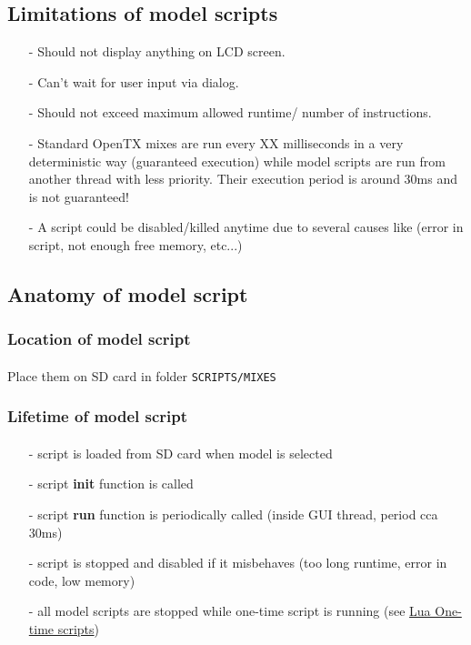 \documentclass[a4paper,french,10pt]{article}
\begin{document}
\subsection{Limitations of model scripts}
\begin{itemize}[leftmargin=*,itemsep=5mm,nolistsep]
\item[-] Should not display anything on LCD screen.
\item[-] Can't wait for user input via dialog.
\item[-] Should not exceed maximum allowed runtime/ number of instructions.
\item[-] Standard OpenTX mixes are run every XX milliseconds in a very deterministic way (guaranteed execution) while model scripts are run from another thread with less priority. Their execution period is around 30ms and is not guaranteed!
\item[-] A script could be disabled/killed anytime due to several causes like (error in script, not enough free memory, etc...)
\end{itemize}

\subsection{Anatomy of model script}
\subsubsection{Location of model script}
\paragraph{}
Place them on SD card in folder \texttt{SCRIPTS/MIXES}
\subsubsection{Lifetime of model script}
\paragraph{}
\begin{itemize}[leftmargin=*,itemsep=5mm,nolistsep]
\item[-] script is loaded from SD card when model is selected
\item[-] script \textbf{init} function is called
\item[-] script \textbf{run} function is periodically called (inside GUI thread, period cca 30ms)
\item[-] script is stopped and disabled if it misbehaves (too long runtime, error in code, low memory)
\item[-] all model scripts are stopped while one-time script is running (see \href{dunno}{Lua One-time scripts})
\end{itemize}
\end{document}
